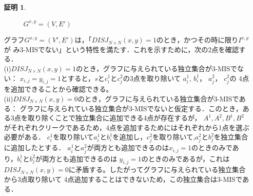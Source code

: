 \documentclass[12pt]{thesis}
\theoremstyle{definition}
\newtheorem*{prf*}{証明}
\begin{document}
\begin{prf*}
\begin{figure}[ht]
\begin{center}
\end{center}
\caption{$G^{x, y} = (V, E')$}
\label{3_G(x,y)}
\end{figure}
グラフ$G^{x, y} = (V', E')$は，「$DISJ_{N \times N} (x, y) = 1$のとき，かつその時に限り$I^{x,y}$が
み3-MISでない」という特性を満たす．これを示すために，次の2点を確認する． \\
(i)$DISJ_{N \times N} (x, y) = 1$のとき，グラフに与えられている独立集合が3-MISでない： 
$x_{i, j} = y_{i, j} =1$とすると，$s$と$c_{i}^{1}$と$c_{j}^{2}$の3点を取り除いて
$a_{i}^{1}$, $b_{i}^{1}$， $a_{j}^{2}$， $c_{j}^{2}$の
4点を追加できることから確認できる。 \\
(ii)$DISJ_{N \times N} (x, y) = 0$のとき，グラフに与えられている独立集合が3-MISである： 
グラフに与えられている独立集合が3-MISでないと仮定する．このとき，ある3点を取り除くことで独立集合に追加できる4点が存在するが，
$A^{1}, A^{2}, B^{1}, B^{2}$がそれぞれクリークであるため，4点を追加するためにはそれぞれから1点を選ぶ必要がある．
$c_{i}^{1}$を取り除いて$a_{i}^{1}$と$b_{i}^{1}$を追加し，$c_{j}^{2}$を取り除いて,$a_{j}^{2}$と$b_{j}^{2}$を独立集合に追加したとする．
$a_{i}^{1}$と$a_{j}^{2}$が両方とも追加できるのは$x_{i, j} = 1$のときのみであり，$b_{i}^{1}$と$b_{j}^{2}$が両方とも追加できるのは
$y_{i, j} = 1$のときのみであるが，これは$DISJ_{N \times N} (x, y) = 0$に矛盾する。したがってグラフに与えられている独立集合から3点取り除いて
4点追加することはできないため，この独立集合は3-MISである．


\end{prf*}
\end{document}
